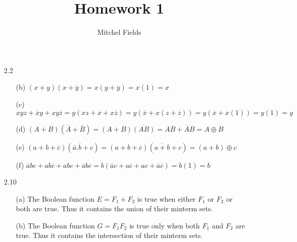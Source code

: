 \documentclass{article}
\title{Homework 1}
\author{Mitchel Fields}
\begin{document}
\maketitle
\begin{itemize}

	\item [2.2]
	\begin{itemize}
		\item [(b)] $(x + y) (x + \overline{y}) = x(y + \overline{y}) = x(1) = x$
		\item [(c)] $xyz + \overline{x}y + xy\overline{z} = y(xz + \overline{x} + x\overline{z}) = y(\overline{x} + x(z + \overline{z})) = y(\overline{x} + x(1)) = y(1) = y$
		\item [(d)] $(A + B)(\overline{A} + \overline{B}) = (A + B)\overline{(AB)} = A\overline{B} + \overline{A}B = A \oplus B$
		\item [(e)] $(a + b + \overline{c})(\overline{a}.\overline{b} + c) = (a + b + \overline{c})(\overline{a + b} + c) = (a + b) \oplus c$
		\item [(f)] $\overline{a}bc + ab\overline{c} + abc + \overline{a}b\overline{c} = b(\overline{a}c + a\overline{c} + ac + \overline{a}\overline{c}) = b(1) = b$
	\end{itemize}

	\item [2.10]
	\begin{itemize}
		\item [(a)] The Boolean function $E = F_1 + F_2$ is true when either $F_1$ or $F_2$ or both are true. Thus it contains the union of their minterm sets.
		\item [(b)] The Boolean function $G = F_1F_2$ is true only when both $F_1$ and $F_2$ are true. Thus it contains the intersection of their minterm sets.
	\end{itemize}


\end{itemize}
\end{document}
